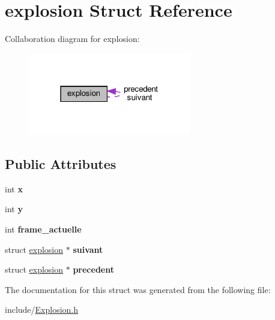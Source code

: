 \hypertarget{structexplosion}{}\section{explosion Struct Reference}
\label{structexplosion}


Collaboration diagram for explosion\+:
\nopagebreak
\begin{figure}[H]
\begin{center}
\leavevmode
\includegraphics[width=202pt]{structexplosion__coll__graph}
\end{center}
\end{figure}
\subsection*{Public Attributes}
\begin{DoxyCompactItemize}
\item 
\mbox{\label{structexplosion_afb7df22fd3540da8744837fa935000fb}} 
int {\bfseries x}
\item 
\mbox{\label{structexplosion_af2b9589d8facce8374b68e27afdbd1b4}} 
int {\bfseries y}
\item 
\mbox{\label{structexplosion_af84ea334a0103280678b077cd0ed496a}} 
int {\bfseries frame\+\_\+actuelle}
\item 
\mbox{\label{structexplosion_ad68451fd5b81b32a85f692b130378478}} 
struct \hyperlink{structexplosion}{explosion} $\ast$ {\bfseries suivant}
\item 
\mbox{\label{structexplosion_a07ca1a4a4c8145566bf4558001309faa}} 
struct \hyperlink{structexplosion}{explosion} $\ast$ {\bfseries precedent}
\end{DoxyCompactItemize}


The documentation for this struct was generated from the following file\+:\begin{DoxyCompactItemize}
\item 
include/\hyperlink{_explosion_8h}{Explosion.\+h}\end{DoxyCompactItemize}
